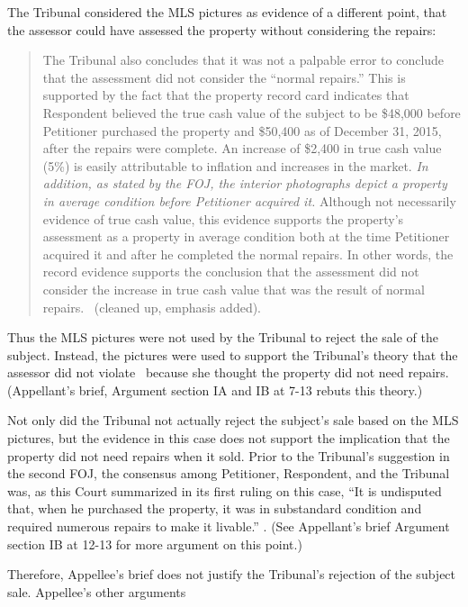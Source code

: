 \documentclass[12pt,\documentclassflag]{michiganCourtOfAppealsBrief}
\begin{document}
The Tribunal considered the MLS pictures as evidence of a different point, that the assessor could have assessed the property without considering the repairs:

\begin{quote}
  The Tribunal also concludes that it was not a palpable error to conclude that the assessment did not consider the ``normal repairs.'' This is supported by the fact that the property record card indicates that Respondent believed the true cash value of the subject to be \$48,000 before Petitioner purchased the property and \$50,400 as of December 31, 2015, after the repairs were complete. An increase of \$2,400 in true cash value (5\%) is easily attributable to inflation and increases in the market. {\em In addition, as stated by the FOJ, the interior photographs depict a property in average condition before Petitioner acquired it.} Although not necessarily evidence of true cash value, this evidence supports the property's assessment as a property in average condition both at the time Petitioner acquired it and after he completed the normal repairs. In other words, the record evidence supports the conclusion that the assessment did not consider the increase in true cash value that was the result of normal repairs. \reconsiderationDenied[2]\ (cleaned up, emphasis added).
\end{quote}

Thus the MLS pictures were not used by the Tribunal to reject the sale of the subject. Instead, the pictures were used to support the Tribunal's theory that the assessor did not violate \mathieuGast\ because she thought the property did not need repairs. (Appellant's brief, Argument section IA and IB at 7-13 rebuts this theory.)

Not only did the Tribunal not actually reject the subject's sale based on the MLS pictures, but the evidence in this case does not support the implication that the property did not need repairs when it sold. Prior to the Tribunal's suggestion in the second FOJ, the consensus among Petitioner, Respondent, and the Tribunal was, as this Court summarized in its first ruling on this case, ``It is undisputed that, when he purchased the property, it was in substandard condition and required numerous repairs to make it livable.'' . (See Appellant's brief Argument section IB at 12-13 for more argument on this point.)

Therefore, Appellee's brief does not justify the Tribunal's rejection of the subject sale.
Appellee's other arguments
\end{document}
